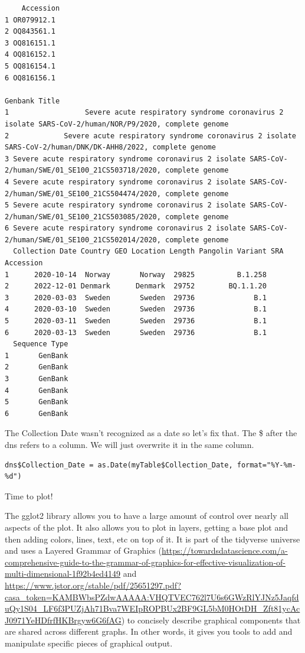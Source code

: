\documentclass[
]{book}
\begin{document}
\begin{verbatim}
    Accession
1 OR079912.1
2 OQ843561.1
3 OQ816151.1
4 OQ816152.1
5 OQ816154.1
6 OQ816156.1
                                                                                                           Genbank Title
1                  Severe acute respiratory syndrome coronavirus 2 isolate SARS-CoV-2/human/NOR/P9/2020, complete genome
2             Severe acute respiratory syndrome coronavirus 2 isolate SARS-CoV-2/human/DNK/DK-AHH8/2022, complete genome
3 Severe acute respiratory syndrome coronavirus 2 isolate SARS-CoV-2/human/SWE/01_SE100_21CS503718/2020, complete genome
4 Severe acute respiratory syndrome coronavirus 2 isolate SARS-CoV-2/human/SWE/01_SE100_21CS504474/2020, complete genome
5 Severe acute respiratory syndrome coronavirus 2 isolate SARS-CoV-2/human/SWE/01_SE100_21CS503085/2020, complete genome
6 Severe acute respiratory syndrome coronavirus 2 isolate SARS-CoV-2/human/SWE/01_SE100_21CS502014/2020, complete genome
  Collection Date Country GEO Location Length Pangolin Variant SRA Accession
1      2020-10-14  Norway       Norway  29825          B.1.258
2      2022-12-01 Denmark      Denmark  29752        BQ.1.1.20
3      2020-03-03  Sweden       Sweden  29736              B.1
4      2020-03-10  Sweden       Sweden  29736              B.1
5      2020-03-11  Sweden       Sweden  29736              B.1
6      2020-03-13  Sweden       Sweden  29736              B.1
  Sequence Type
1       GenBank
2       GenBank
3       GenBank
4       GenBank
5       GenBank
6       GenBank
\end{verbatim}

\hfill\break

The Collection Date wasn't recognized as a date so let's fix that. The \$ after the dns refers to a column. We will just overwrite it in the same column.

\begin{verbatim}
dns$Collection_Date = as.Date(myTable$Collection_Date, format="%Y-%m-%d")
\end{verbatim}

Time to plot!

The gglot2 library allows you to have a large amount of control over nearly all aspects of the plot. It also allows you to plot in layers, getting a base plot and then adding colors, lines, text, etc on top of it. It is part of the tidyverse universe and uses a Layered Grammar of Graphics (\url{https://towardsdatascience.com/a-comprehensive-guide-to-the-grammar-of-graphics-for-effective-visualization-of-multi-dimensional-1f92b4ed4149} and \url{https://www.jstor.org/stable/pdf/25651297.pdf?casa_token=KAMBWbsPZdwAAAAA:VHQTVEC762l7U6s6GWzRlYJNz5JaqfduQy1S04_LF6f3PUZjAh71Bva7WEIpROPBUx2BF9GL5bM0HOtDH_Zft81ycAcJ0971YeHDfrfHKBrgyw6G6fAG}) to concisely describe graphical components that are shared across different graphs. In other words, it gives you tools to add and manipulate specific pieces of graphical output.
\end{document}
